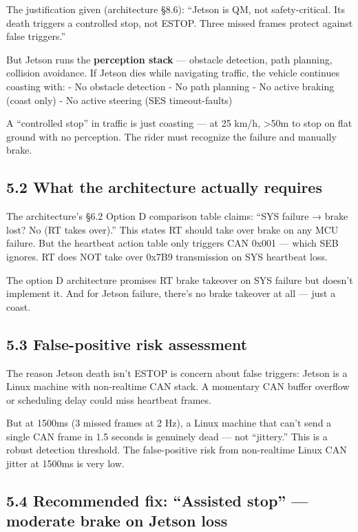 \documentclass[12pt,a4paper,oneside]{report}
\begin{document}
The justification given (architecture §8.6): ``Jetson is QM, not
safety-critical. Its death triggers a controlled stop, not ESTOP. Three missed
frames protect against false triggers.''

But Jetson runs the \textbf{perception stack} --- obstacle detection, path
planning, collision avoidance. If Jetson dies while navigating traffic, the
vehicle continues coasting with: - No obstacle detection - No path planning - No
active braking (coast only) - No active steering (SES timeout-faults)

A ``controlled stop'' in traffic is just coasting --- at 25 km/h,
\textgreater50m to stop on flat ground with no perception. The rider must
recognize the failure and manually brake.

\subsection{5.2 What the architecture actually
requires}\label{what-the-architecture-actually-requires}

The architecture's §6.2 Option D comparison table claims: ``SYS failure → brake
lost? No (RT takes over).'' This states RT should take over brake on any MCU
failure. But the heartbeat action table only triggers CAN 0x001 --- which SEB
ignores. RT does NOT take over 0x7B9 transmission on SYS heartbeat loss.

The option D architecture promises RT brake takeover on SYS failure but doesn't
implement it. And for Jetson failure, there's no brake takeover at all --- just
a coast.

\subsection{5.3 False-positive risk
assessment}\label{false-positive-risk-assessment}

The reason Jetson death isn't ESTOP is concern about false triggers: Jetson is a
Linux machine with non-realtime CAN stack. A momentary CAN buffer overflow or
scheduling delay could miss heartbeat frames.

But at 1500ms (3 missed frames at 2 Hz), a Linux machine that can't send a
single CAN frame in 1.5 seconds is genuinely dead --- not ``jittery.'' This is a
robust detection threshold. The false-positive risk from non-realtime Linux CAN
jitter at 1500ms is very low.

\subsection{5.4 Recommended fix: ``Assisted stop'' --- moderate brake on Jetson
loss}\label{recommended-fix-assisted-stop-moderate-brake-on-jetson-loss}
\end{document}
